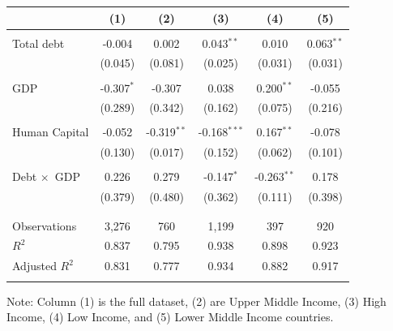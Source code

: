 \documentclass[10pt]{beamer}
\begin{document}
\begin{frame}
	\begin{center}
	\begin{threeparttable}[!htbp] \centering \footnotesize
		\caption{Regression Results} 
		\label{} 
		\begin{tabular}{@{\extracolsep{5pt}}lccccc} \toprule
			 & (1) & (2) & (3) & (4) & (5) \\
			\hline \\[-1.8ex] 
			Total debt & -0.004 & 0.002 & 0.043$^{**}$ & 0.010 & 0.063$^{**}$  \\ 
			& (0.045) & (0.081) & (0.025) & (0.031) & (0.031) \\ 
			& & & & & \\ 
			GDP & -0.307$^{*}$ & -0.307 & 0.038 & 0.200$^{**}$ & -0.055  \\ 
			& (0.289) & (0.342) & (0.162) & (0.075) & (0.216) \\ 
			& & & & & \\ 
			Human Capital & -0.052 & -0.319$^{**}$ & -0.168$^{***}$ & 0.167$^{**}$ &-0.078 \\ 
			& (0.130) & (0.017) & (0.152) & (0.062) & (0.101)\\ 
			& & & & & \\ 
			Debt $\times$\, GDP & 0.226 & 0.279 & -0.147$^{*}$ & -0.263$^{**}$ & 0.178 \\ 
			& (0.379) & (0.480) & (0.362) & (0.111) & (0.398) \\ 
			& & & & &  \\ 
			\hline \\[-1.8ex] 
			Observations & 3,276 & 760 & 1,199 & 397 & 920 \\ 
			$R^{2}$ & 0.837 & 0.795 & 0.938 & 0.898 & 0.923  \\ 
			Adjusted $R^{2}$ & 0.831 & 0.777 & 0.934 & 0.882 & 0.917 \\ 
			\midrule \\
		\end{tabular} 
		\begin{tablenotes} \scriptsize{
		\item Note: Column (1) is the full dataset, (2) are Upper Middle Income, (3) High Income, (4) Low Income, and (5) Lower Middle Income countries.}
		\end{tablenotes}
	\end{threeparttable} 
\end{center}

\end{frame}
\end{document}
